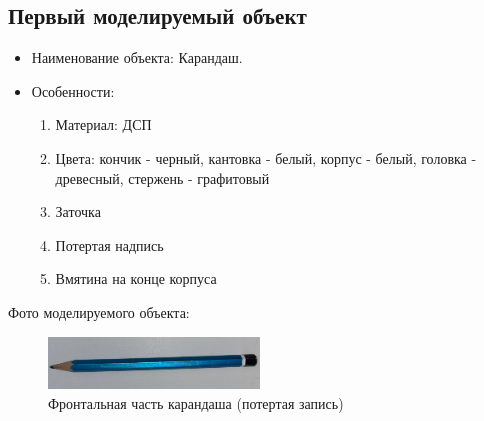 \documentclass[areasetadvanced]{scrartcl}
\begin{document}
\subsection{Первый моделируемый объект}
\begin{itemize}
    \item Наименование объекта: Карандаш.
	\item Особенности: \begin{enumerate}
        \item Материал: ДСП
        \item Цвета: кончик - черный, кантовка - белый, корпус - белый, головка - древесный, стержень - графитовый
        \item Заточка
        \item Потертая надпись
        \item Вмятина на конце корпуса
    \end{enumerate}
\end{itemize}
Фото моделируемого объекта: %
\begin{figure}[H]
    \centering
    \includegraphics[width=0.5\textwidth]{PencilName.png}
    \caption{Фронтальная часть карандаша (потертая запись)}
    \label{fig:syntdiag}
\end{figure}
\end{document}
